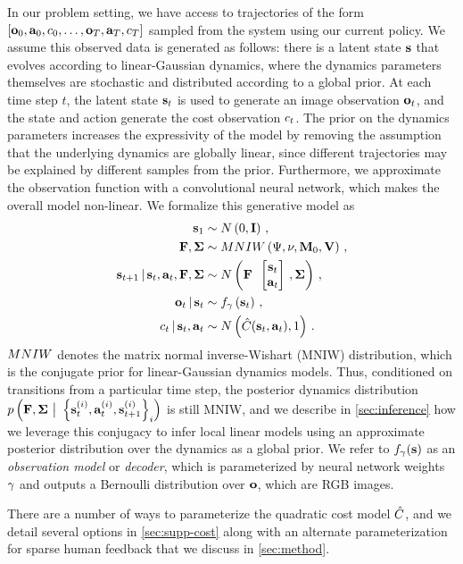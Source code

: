In our problem setting, we have access to trajectories of the form $\left[\mathbf{o}_0,\mathbf{a}_0,c_0,\ldots,\mathbf{o}_{T},\mathbf{a}_{T},c_{T}\right]$ sampled from the system using our current policy. We assume this observed data is generated as follows: there is a latent state $\mathbf{s}$ that evolves according to linear-Gaussian dynamics, where the dynamics parameters themselves are stochastic and distributed according to a global prior. At each time step $t$, the latent state $\mathbf{s}_t$ is used to generate an image observation $\mathbf{o}_t$, and the state and action generate the cost observation $c_t$. The prior on the dynamics parameters increases the expressivity of the model by removing the assumption that the underlying dynamics are globally linear, since different trajectories may be explained by different samples from the prior. Furthermore, we approximate the observation function with a convolutional neural network, which makes the overall model non-linear. We formalize this generative model as
\begin{align}
    \state_1&\sim\N\left(0,\mathbf{I}\right)\,,\label{eq:gm-start}\\
    \dynmat,\dyncovar&\sim\MNIW\left(\Psi,\nu,\mathbf{M}_0,\mathbf{V}\right)\,,\label{eq:dyn}\\
    \state_{t+1}\given\state_t,\action_t,\dynmat,\dyncovar&\sim\N\left(\dynmat\colvec{\state_t\\\action_t},\dyncovar\right)\,,\label{eq:dyn2}\\
    \observation_t\given\state_t&\sim\decoder_\gamma\left(\state_t\right)\,,\\
    \costsample_t\given\state_t,\action_t&\sim\N\left(\costmodel(\state_t,\action_t),1\right)\,.\label{eq:gm-end}
\end{align}
$MNIW$ denotes the matrix normal inverse-Wishart (MNIW) distribution, which is the conjugate prior for linear-Gaussian dynamics models. Thus, conditioned on transitions from a particular time step, the posterior dynamics distribution $p\left(\mathbf{F},\bm{\Sigma}~\big|~\left\{\mathbf{s}^{(i)}_t,\mathbf{a}^{(i)}_t,\mathbf{s}^{(i)}_{t+1}\right\}_i\right)$ is still MNIW, and we describe in \autoref{sec:inference} how we leverage this conjugacy to infer local linear models using an approximate posterior distribution over the dynamics as a global prior. We refer to $f_\gamma(\mathbf{s})$ as an \emph{observation model} or \emph{decoder}, which is parameterized by neural network weights $\gamma$ and outputs a Bernoulli distribution over $\mathbf{o}$, which are RGB images.

There are a number of ways to parameterize the quadratic cost model $\hat{C}$, and we detail several options in \autoref{sec:supp-cost} along with an alternate parameterization for sparse human feedback that we discuss in \autoref{sec:method}.

